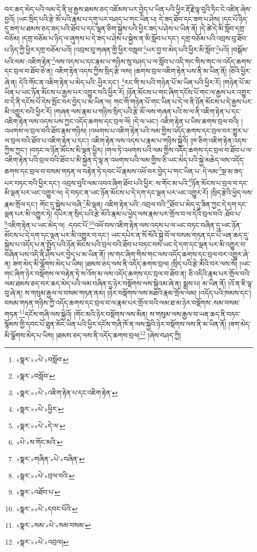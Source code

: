 བར་ཆད་མེད་པའི་ལམ་དེ་ནི་ཕྲ་རྒྱས་ཐམས་ཅད་འཇོམས་པར་བྱེད་པ་ཡིན་པའི་ཕྱིར་རྡོ་རྗེ་ལྟ་བུའི་ཏིང་ངེ་འཛིན་ཞེས་བྱའོ། །ཡང་སྲིད་པའི་རྩེ་མོ་པའི་རྣམ་པ་དགུ་པར་བཤད་པ་གང་ཡིན་པ། དེ་ཟད་ཐོབ་དང་ཟག་པ་ཤེས། །དང་པོ་ཉིད་དུ་ཟག་པ་ཐམས་ཅད་ཟད་པའི་ཐོབ་པ་དང་ལྷན་ཅིག་སྐྱེས་པའི་ཕྱིར་ཟད་པ་ཤེས་པ་ཡིན་ནོ། །དེ་ཚེ་དེ་མི་སློབ་དགྲ་བཅོམ། །དགྲ་བཅོམ་པ་ཉིད་ལ་ཞུགས་པ་དེ་ཟད་པ་ཤེས་པ་སྐྱེས་ན་མི་སློབ་པ་དང་། དགྲ་བཅོམ་པའི་འབྲས་བུ་ཐོབ་པ་ཉིད་ཀྱི་ཕྱིར་དགྲ་བཅོམ་པའོ། །འབྲས་བུ་གཞན་གྱི་ཕྱིར་བསླབ་\footnote{«སྣར་»«པེ་»བསློབ་}པར་བྱ་བ་མེད་པའི་ཕྱིར་མི་སློབ་\footnote{«སྣར་»བསློབ་}པའོ། །བསྒོམ་པའི་ལམ་:འཇིག་རྟེན་\footnote{«སྣར་»«པེ་»འཇིག་རྟེན་པ་དང་འཇིག་རྟེན་}ལས་འདས་པ་དང་རྣམ་པ་གཉིས་སུ་བཤད་པ་ལ་སློབ་པ་འདི་གང་གིས་གང་ལ་འདོད་ཆགས་དང་བྲལ་བ་ཐོབ་ཅེ་ན། འཇིག་རྟེན་འདས་ཀྱིས་སྲིད་རྩེ་ལས། །ཆགས་བྲལ་འཇིག་རྟེན་པས་ནི་མ་ཡིན་ནོ། །ཅིའི་ཕྱིར་ཞེ་ན། དེའི་གོང་ན་འཇིག་རྟེན་པ་མེད་པའི་:ཕྱིར་དང་། \footnote{«སྣར་»«པེ་»ཕྱིར་}རང་གི་ས་པའི་གཉེན་པོ་མ་ཡིན་པའི་ཕྱིར་རོ། །གཉེན་པོ་མ་ཡིན་པ་ཡང་ཉོན་མོངས་པ་རྒྱས་པར་འགྱུར་བའི་ཕྱིར་རོ། །ཉོན་མོངས་པ་གང་ཞིག་དངོས་པོ་གང་ལ་རྒྱས་པར་འགྱུར་བ་དེ་ནི་དངོས་པོ་དེས་སྤོང་བར་བྱེད་པ་མ་ཡིན་ལ། གང་གི་གཉེན་པོ་གང་ཡིན་པ་དེ་ལ་ནི་ཉོན་མོངས་པ་དེ་རྒྱས་པར་མི་འགྱུར་བའི་ཕྱིར་རོ། །གཞན་ལས་རྣམ་པ་གཉིས་སྲིད་པའི་རྩེ་མོ་ལས་གཞན་པའི་ས་ལ་ནི་འཇིག་རྟེན་པ་དང་འཇིག་རྟེན་ལས་འདས་པས་ཀྱང་འདོད་ཆགས་དང་བྲལ་ལོ། །དེ་ལ་ཡང་། འཇིག་རྟེན་པ་ཡིས་ཆགས་བྲལ་བའི། །འཕགས་ལ་བྲལ་བའི་ཐོབ་རྣམ་གཉིས། །འཕགས་པ་འཇིག་རྟེན་པའི་ལམ་གྱིས་འདོད་ཆགས་དང་བྲལ་བར་གྱུར་པ་ལ་བྲལ་བའི་ཐོབ་པ་འཇིག་རྟེན་པ་དང་། འཇིག་རྟེན་ལས་འདས་པ་རྣམ་པ་གཉིས་སྐྱེའོ། །ཁ་ཅིག་འཇིག་རྟེན་འདས་ཀྱིས་ཀྱང་། །བཏང་ལ་ཉོན་མོངས་མི་ལྡན་ཕྱིར། །གལ་ཏེ་འཕགས་པའི་ལམ་གྱིས་འདོད་ཆགས་དང་བྲལ་བ་ཐོབ་པ་ལ་འཇིག་རྟེན་པའི་བྲལ་བའི་ཐོབ་པ་མི་སྐྱེན་དེ་ལྟ་ན་འཕགས་པའི་ལམ་གྱིས་ཅི་ཡང་མེད་པའི་སྐྱེ་མཆེད་ལས་འདོད་ཆགས་དང་བྲལ་བ་བསམ་གཏན་ལ་བརྟེན་ཏེ་དབང་པོ་རྣམས་འཕོ་བར་བྱེད་པ་གང་ཡིན་པ་:དེ་ལམ་\footnote{«སྣར་»«པེ་»དེ་ལ་}སྔ་མ་ཟད་པར་བཏང་བའི་ཕྱིར་དང་། འབྲས་བུའི་ལམ་འབའ་ཞིག་ཐོབ་པའི་ཕྱིར་:ས་གོང་མ་པའི་\footnote{«པེ་»ས་གོང་མའི་}ཉོན་མོངས་པ་བྲལ་བ་དང་མི་ལྡན་པར་ཡང་འགྱུར་ལ། དེ་བཏང་ན་ཡང་ཉོན་མོངས་པ་དེ་དག་དང་ལྡན་པར་ཡང་འགྱུར་རོ། །སྲིད་རྩེའི་ཕྱེད་ལས་རྣམ་གྲོལ་དང་། གོང་དུ་སྐྱེས་པ་བཞི་\footnote{«སྣར་»གཞིན་«པེ་»བཞིན་}མི་ལྡན། འཇིག་རྟེན་པའི་:འབྲལ་བའི་\footnote{«སྣར་»«པེ་»བྲལ་བའི་}ཐོབ་པ་མེད་དུ་ཟིན་ཀྱང་དེ་དག་དང་ལྡན་པར་མི་འགྱུར་ཏེ། དཔེར་ན་སྲིད་པའི་རྩེ་མོའི་རྣམ་པ་ཕྱེད་ལས་རྣམ་པར་གྲོལ་བ་ལ་དེའི་བྲལ་བའི་:ཐོབ་པ་\footnote{«སྣར་»འཐོབ་པ་}འཇིག་རྟེན་པ་ཡང་མེད་ལ། :དབང་པོ་\footnote{«སྣར་»«པེ་»དབང་པོའི་}འཕོ་བས་འཇིག་རྟེན་ལས་འདས་པ་ལ་ཡང་བཏང་བཞིན་དུ་ཡང་ཉོན་མོངས་པ་དེ་དག་དང་ལྡན་པར་མི་འགྱུར་བ་དང་། ཡང་དཔེར་ན་སོ་སོའི་སྐྱེ་བོ་ལ་བསམ་གཏན་དང་པོ་ཡན་ཆད་དུ་སྐྱེས་པ་འདོད་པ་ན་སྤྱོད་པའི་ཉོན་མོངས་པའི་བྲལ་བའི་ཐོབ་པ་བཏང་བས་ཡང་དེ་དག་དང་ལྡན་པར་མི་འགྱུར་བ་བཞིན་པས་འདི་ནི་ཤེས་པར་བྱེད་པ་མ་ཡིན་ནོ། །ས་གང་ཞིག་གིས་གང་ལས་འདོད་ཆགས་དང་བྲལ་བར་འགྱུར་ཞེ་ན། ཟག་མེད་མི་ལྕོགས་མེད་པ་ཡིས། །ཐམས་ཅད་ལས་ནི་འདོད་ཆགས་བྲལ། །སྲིད་པའི་རྩེ་མོའི་བར་ལས་སོ། །ཡང་གང་ཞིག་ཉེར་བསྡོགས་ལ་བརྟེན་ཏེ་ས་འོག་མ་ལས་འདོད་ཆགས་དང་བྲལ་བ་ཐོབ་ན། ཅི་འདིའི་རྣམ་པར་གྲོལ་བའི་ལམ་ཐམས་ཅད་བར་ཆད་མེད་པའི་ལམ་བཞིན་དུ་ཉེར་བསྡོགས་ལས་སྐྱེའམ་ཞེ་ན། སྨྲས་པ། མ་ཡིན་ནོ། །འོ་ན་ཇི་ལྟ་བུ་ཞེ་ན། ས་གསུམ་རྒྱལ་ལ་བསམ་གཏན་ནམ། །ཉེར་བསྡོགས་ལས་མཐའི་རྣམ་གྲོལ་ལམ། །འདོད་པའི་ཁམས་དང་། བསམ་གཏན་གཉིས་ཀྱི་འདོད་ཆགས་དང་བྲལ་བ་ལ་རྣམ་པར་གྲོལ་བའི་ལམ་ཐ་མ་ཉེར་བསྡོགས་:སམ་བསམ་གཏན་\footnote{«སྣར་»སམ་«པེ་»སམ་བསམ་}དངོས་གཞི་ལས་སྐྱེའོ། །གོང་མའི་ཉེར་བསྡོགས་ལས་མིན། ས་གསུམ་ལས་རྒྱལ་བ་ཡན་ཆད་ནི་བཏང་སྙོམས་གྱི་དབང་པོ་ཐུན་མོང་ཡིན་པའི་ཕྱིར་དངོས་གཞི་ཁོ་ན་ལས་སྐྱེའི་ཉེར་བསྡོགས་ལས་ནི་མ་ཡིན་ནོ། །ཟག་མེད་མི་ལྕོགས་མེད་པ་ཡིས། །ཐམས་ཅད་ལས་ནི་འདོད་ཆགས་བྲལ།\footnote{«སྣར་»«པེ་»འབྲལ།} །ཞེས་བཤད་ཀྱི། 